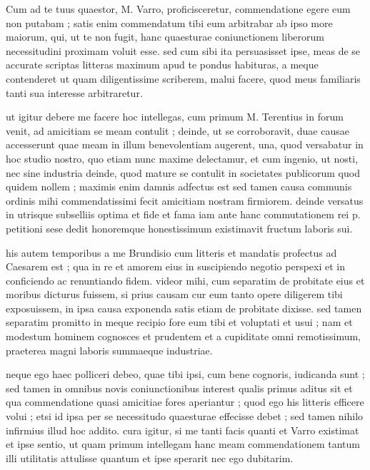 


 Cum ad te tuus quaestor, M. Varro, proficisceretur, commendatione egere eum non putabam ; satis enim commendatum tibi eum arbitrabar ab ipso more maiorum, qui, ut te non fugit, hanc quaesturae coniunctionem liberorum necessitudini proximam voluit esse. sed cum sibi ita persuasisset ipse, meas de se accurate scriptas litteras maximum apud te pondus habituras, a meque contenderet ut quam diligentissime scriberem, malui facere, quod meus familiaris tanti sua interesse arbitraretur.

 ut igitur debere me facere hoc intellegas, cum primum M. Terentius in forum venit, ad amicitiam se meam contulit ; deinde, ut se corroboravit, duae causae accesserunt quae meam in illum benevolentiam augerent, una, quod versabatur in hoc studio nostro, quo etiam nunc maxime delectamur, et cum ingenio, ut nosti, nec sine industria deinde, quod mature se contulit in societates publicorum quod quidem nollem ; maximis enim damnis adfectus est sed tamen causa communis ordinis mihi commendatissimi fecit amicitiam nostram firmiorem. deinde versatus in utrisque subselliis optima et fide et fama iam ante hanc commutationem rei p. petitioni sese dedit honoremque honestissimum existimavit fructum laboris sui.

 his autem temporibus a me Brundisio cum litteris et mandatis profectus ad Caesarem est ; qua in re et amorem eius in suscipiendo negotio perspexi et in conficiendo ac renuntiando fidem. videor mihi, cum separatim de probitate eius et moribus dicturus fuissem, si prius causam cur eum tanto opere diligerem tibi exposuissem, in ipsa causa exponenda satis etiam de probitate dixisse. sed tamen separatim promitto in meque recipio fore eum tibi et voluptati et usui ; nam et modestum hominem cognosces et prudentem et a cupiditate omni remotissimum, praeterea magni laboris summaeque industriae.

 neque ego haec polliceri debeo, quae tibi ipsi, cum bene cognoris, iudicanda sunt ; sed tamen in omnibus novis coniunctionibus interest qualis primus aditus sit et qua commendatione quasi amicitiae fores aperiantur ; quod ego his litteris efficere volui ; etsi id ipsa per se necessitudo quaesturae effecisse debet ; sed tamen nihilo infirmius illud hoc addito. cura igitur, si me tanti facis quanti et Varro existimat et ipse sentio, ut quam primum intellegam hanc meam commendationem tantum illi utilitatis attulisse quantum et ipse sperarit nec ego dubitarim.
